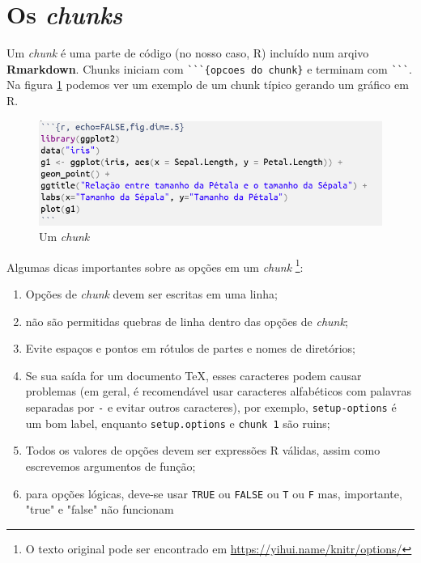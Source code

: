\documentclass[12pt,a4paper,oneside]{erdc}
\begin{document}
	
\section{Os \textit{chunks}}

	Um \textit{chunk} é uma parte de código (no nosso caso, R) incluído num arqivo \textbf{Rmarkdown}. Chunks iniciam com \verb|```{opcoes do chunk}| e terminam com \verb|```|. Na figura \ref{fig:bpcursoteccomp002019f04-05} podemos ver um exemplo de um chunk típico gerando um gráfico em R. 


	\begin{figure}[htpb]
		\centering
		\includegraphics[width=\linewidth]{../figs/BP_Curso_TecComp_00_2019_f04-05}
		\caption{Um \textit{chunk}}
		\label{fig:bpcursoteccomp002019f04-05}
	\end{figure}
	
	Algumas dicas importantes sobre as opções em um \textit{chunk} \footnote{O texto original pode ser encontrado em \url{https://yihui.name/knitr/options/}}:
	
	\begin{enumerate}
		\item Opções de \textit{chunk} devem ser escritas em uma linha; 
		\item não são permitidas quebras de linha dentro das opções de \textit{chunk};
		\item Evite espaços e pontos em rótulos de partes e nomes de diretórios; 
		\item Se sua saída for um documento TeX, esses caracteres podem causar problemas (em geral, é recomendável usar caracteres alfabéticos com palavras separadas por \verb|-| e evitar outros caracteres), por exemplo, \verb|setup-options| é um bom label, enquanto \verb|setup.options| e \verb|chunk 1| são ruins;
		\item Todos os valores de opções devem ser expressões R válidas, assim como escrevemos argumentos de função;
		\item para opções lógicas, deve-se usar \verb|TRUE| ou \verb|FALSE| ou \verb|T| ou \verb|F| mas, importante, "true" e "false"  não funcionam
	\end{enumerate}
	
\end{document}
